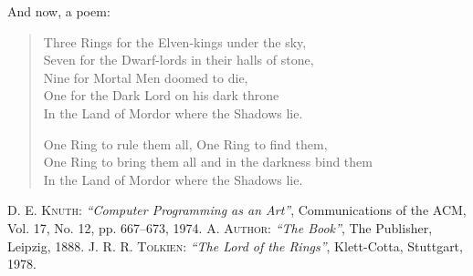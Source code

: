 \documentclass{scrreprt}
\begin{document}
	And now, a poem:
	\begin{verse}
		Three Rings for the Elven-kings under the sky,\\
		Seven for the Dwarf-lords in their halls of stone,\\
		Nine for Mortal Men doomed to die,\\
		One for the Dark Lord on his dark throne\\
		In the Land of Mordor where the Shadows lie.
		
		One Ring to rule them all, One Ring to find them,\\
			One Ring to bring them all and in the darkness bind them\\        
		In the Land of Mordor where the Shadows lie. \cite[P.\,7]{tolkien66}
	\end{verse}

	\appendix
	\printindex

	\begin{thebibliography}{9}
	 \textsc{D. E. Knuth}: \textit{“Computer Programming as an Art”}, Communications of the ACM, Vol. 17, No. 12, pp. 667–673, 1974.
	 \textsc{A. Author}: \textit{“The Book”}, The Publisher, Leipzig, 1888.
	 \textsc{J. R. R. Tolkien}: \textit{“The Lord of the Rings”}, Klett-Cotta, Stuttgart, 1978.
	\end{thebibliography}
\end{document}
